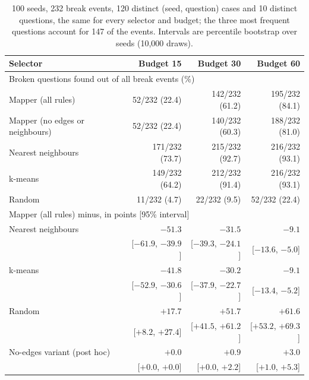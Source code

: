 \begin{table}[htbp]
  \centering
  \footnotesize
  \setlength{\tabcolsep}{4pt}
  \begin{tabular}{lrrr}
    \hline
    Selector & Budget 15 & Budget 30 & Budget 60 \\
    \hline
    \multicolumn{4}{l}{Broken questions found out of all break events (\%)} \\
    Mapper (all rules) & 52/232 (22.4) & 142/232 (61.2) & 195/232 (84.1) \\
    Mapper (no edges or neighbours) & 52/232 (22.4) & 140/232 (60.3) & 188/232 (81.0) \\
    Nearest neighbours & 171/232 (73.7) & 215/232 (92.7) & 216/232 (93.1) \\
    k-means & 149/232 (64.2) & 212/232 (91.4) & 216/232 (93.1) \\
    Random & 11/232 (4.7) & 22/232 (9.5) & 52/232 (22.4) \\
    \hline
    \multicolumn{4}{l}{Mapper (all rules) minus, in points [95\% interval]} \\
    Nearest neighbours & $-51.3$ & $-31.5$ & $-9.1$ \\
    & [$-61.9$, $-39.9$] & [$-39.3$, $-24.1$] & [$-13.6$, $-5.0$] \\
    k-means & $-41.8$ & $-30.2$ & $-9.1$ \\
    & [$-52.9$, $-30.6$] & [$-37.9$, $-22.7$] & [$-13.4$, $-5.2$] \\
    Random & $+17.7$ & $+51.7$ & $+61.6$ \\
    & [$+8.2$, $+27.4$] & [$+41.5$, $+61.2$] & [$+53.2$, $+69.3$] \\
    No-edges variant (post hoc) & $+0.0$ & $+0.9$ & $+3.0$ \\
    & [$+0.0$, $+0.0$] & [$+0.0$, $+2.2$] & [$+1.0$, $+5.3$] \\
    \hline
  \end{tabular}
  \caption{100 seeds, 232 break events, 120 distinct (seed, question) cases and 10 distinct questions, the same for every selector and budget; the three most frequent questions account for 147 of the events. Intervals are percentile bootstrap over seeds (10,000 draws).}
  \label{tab:robustness}
\end{table}
